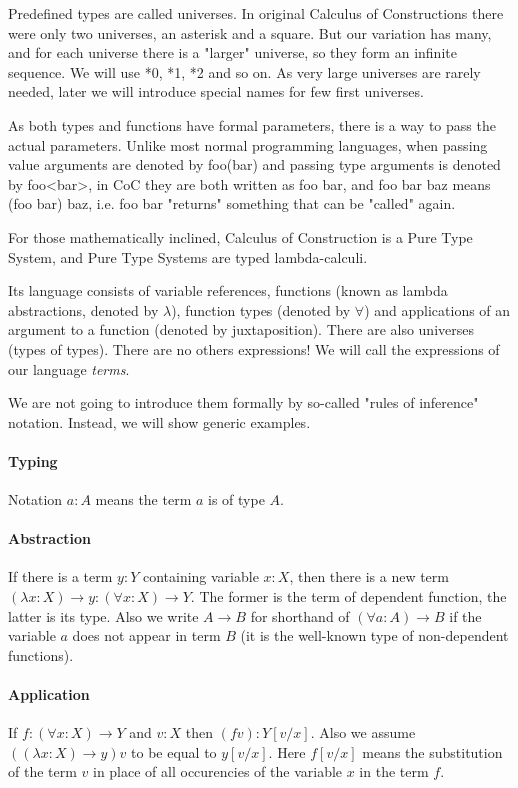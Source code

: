 \documentclass[11pt,oneside]{article}
\begin{document}
Predefined types are called universes. In original Calculus of Constructions
there were only two universes, an asterisk and a square. But our variation has
many, and for each universe there is a "larger" universe, so they form an infinite sequence. We will use *0, *1, *2 and so on. 
As very large universes are rarely needed, later we will introduce special names for few first universes.

As both types and functions have formal parameters, there is a way to pass the actual parameters. Unlike most normal programming languages, when passing value arguments are denoted by foo(bar) and passing type arguments is denoted by foo<bar>, in
CoC they are both written as foo bar, and foo bar baz means (foo bar) baz, i.e. foo bar "returns" something that can be "called" again.

For those mathematically inclined, Calculus of Construction is a Pure Type System, and Pure Type Systems are typed lambda-calculi.

Its language consists of variable references,
functions (known as lambda abstractions,
denoted by $\lambda$),
function types (denoted by $\forall$)
and applications of an argument to a function
(denoted by juxtaposition).
There are also universes (types of types).
There are no others expressions!
We will call the expressions of our language  {\em terms}.

We are not going to introduce them formally by so-called
"rules of inference" notation. Instead, we will show generic examples.

\paragraph{Typing}
Notation $a : A$ means the term $a$ is of type $A$.

\paragraph{Abstraction}
If there is a term $y : Y$ containing variable $x : X$,
then there is a new term
$(\lambda x : X) \rightarrow y : (\forall x : X) \rightarrow Y$.
The former is the term of dependent function, the latter is its type.
Also we write $A \rightarrow B$ for shorthand of
$(\forall a : A) \rightarrow B$ if the variable $a$
does not appear in term $B$
(it is the well-known type of non-dependent functions).

\paragraph{Application}
If $f : (\forall x : X)\rightarrow Y$ and $v : X$  then $(f v) : Y[v/x]$.
Also we assume $((\lambda x : X)\rightarrow y) v$
to be equal to $y[v/x]$.
Here $f[v/x]$ means the substitution of the term $v$ in place of all
occurencies of the variable $x$ in the term $f$.
\end{document}
